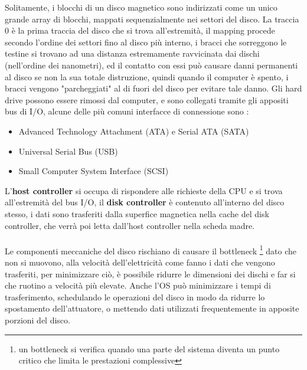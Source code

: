 \documentclass[12pt, letterpaper]{article}
\newcommand{\acc}{\\\hphantom{}\\}
\begin{document}
Solitamente, i blocchi di un disco magnetico sono indirizzati come un unico grande array di blocchi, mappati 
sequenzialmente nei settori del disco. La traccia 0 è la prima traccia del disco che si trova all'estremità, il mapping 
procede secondo l'ordine dei settori fino al disco più interno, i bracci che sorreggono le testine si trovano ad una 
distanza estremamente ravvicinata dai dischi (nell'ordine dei nanometri), ed il contatto con essi può causare danni permanenti al disco se non 
la sua totale distruzione, quindi quando il computer è spento, i bracci vengono "parcheggiati" al di fuori del disco per 
evitare tale danno. Gli hard drive possono essere rimossi dal computer, e sono collegati tramite gli appositi 
bus di I/O, alcune delle più comuni interfacce di connessione sono : \begin{itemize}
    \item Advanced Technology Attachment (ATA) e Serial ATA (SATA)
    \item Universal Serial Bus (USB)
    \item Small Computer System Interface (SCSI)
\end{itemize}
L'\textbf{host controller} si occupa di rispondere alle richieste della CPU e si trova all'estremità del bus I/O,  il 
\textbf{disk controller} è contenuto all'interno del disco stesso, i dati sono trasferiti dalla superfice magnetica 
nella cache del disk controller, che verrà poi letta dall'host controller nella scheda madre.\acc 
Le componenti meccaniche del disco rischiano di causare il bottleneck \footnote{
    un bottleneck si verifica quando una parte del sistema diventa un punto critico che limita le prestazioni complessive
} dato che non si muovono, alla velocità dell'elettricità 
come fanno i dati che vengono trasferiti, per minimizzare ciò, è possibile ridurre le dimensioni dei dischi e far si che 
ruotino a velocità più elevate. Anche l'OS può minimizzare i tempi di trasferimento, schedulando le operazioni del disco 
in modo da ridurre lo spostamento dell'attuatore, o mettendo dati utilizzati frequentemente in apposite porzioni del disco.
\end{document}
